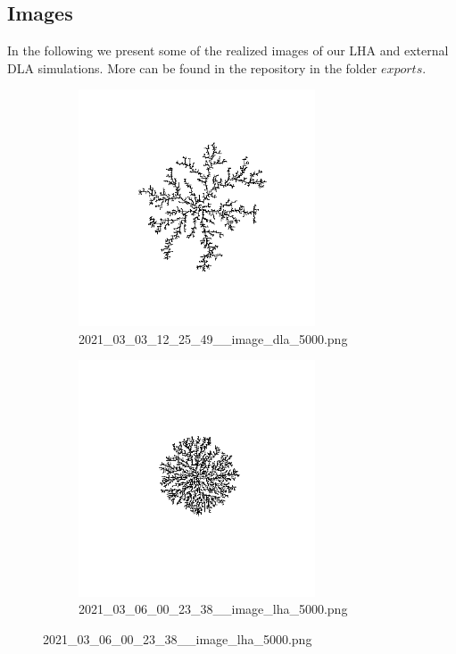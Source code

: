 \documentclass[12pt,a4paper]{scrartcl}
\newcommand{\1}{\mathbbm{1}}
\theoremstyle{definition}
\numberwithin{equation}{section}
\begin{document}
\subsection{Images}
In the following we present some of the realized images of our LHA and external DLA simulations. More can be found in the repository in the folder $\mathit{exports}$.

\begin{figure}[h!]
	\centering
	\begin{subfigure}[b]{.49\textwidth}
		\centerline{\includegraphics[height=7cm]{images/ia/2021_03_03_12_25_49__image_dla_5000.png}}
		\captionsetup{labelformat=empty}
		\caption{2021\_03\_03\_12\_25\_49\_\_image\_dla\_5000.png}
	\end{subfigure}
	\begin{subfigure}[b]{.49\textwidth}
		\centerline{\includegraphics[height=7cm]{images/ia/2021_03_06_00_23_38__image_lha_5000.png}}
		\captionsetup{labelformat=empty}
		\caption{2021\_03\_06\_00\_23\_38\_\_image\_lha\_5000.png}
	\end{subfigure}
\end{figure}
\end{document}
